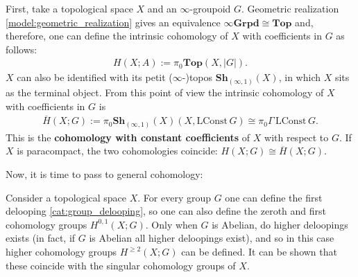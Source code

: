     First, take a topological space $X$ and an $\infty$-groupoid $G$. Geometric realization \ref{model:geometric_realization} gives an equivalence $\infty\mathbf{Grpd}\cong\mathbf{Top}$ and, therefore, one can define the intrinsic cohomology of $X$ with coefficients in $G$ as follows:
    \begin{gather}
        H(X;A) := \pi_0\mathbf{Top}(X,|G|).
    \end{gather}
    $X$ can also be identified with its petit ($\infty$-)topos $\mathbf{Sh}_{(\infty,1)}(X)$, in which $X$ sits as the terminal object. From this point of view the intrinsic cohomology of $X$ with coefficients in $G$ is
    \begin{gather}
        \overline{H}(X;G) := \pi_0\mathbf{Sh}_{(\infty,1)}(X)(X,\mathrm{LConst}\,G) \cong \pi_0\Gamma\,\mathrm{LConst}\,G.
    \end{gather}
    This is the \textbf{cohomology with constant coefficients} of $X$ with respect to $G$. If $X$ is paracompact, the two cohomologies coincide: $H(X;G)\cong\overline{H}(X;G)$.

    Now, it is time to pass to general cohomology:
    \begin{example}
        Consider a topological space $X$. For every group $G$ one can define the first delooping \ref{cat:group_delooping}, so one can also define the zeroth and first cohomology groups $H^{0,1}(X;G)$. Only when $G$ is Abelian, do higher deloopings exists (in fact, if $G$ is Abelian all higher deloopings exist), and so in this case higher cohomology groups $H^{\geq 2}(X;G)$ can be defined. It can be shown that these coincide with the singular cohomology groups of $X$.
    \end{example}

